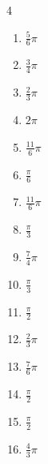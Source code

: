 \begin{multicols}{4}
\begin{enumerate}
  \item $\displaystyle \frac{5}{6}\pi$

  \item $\displaystyle \frac{3}{4}\pi$

  \item $\displaystyle \frac{2}{3}\pi$

  \item $\displaystyle 2\pi$

  \item $\displaystyle \frac{11}{6}\pi$

  \item $\displaystyle \frac{\pi}{6}$

  \item $\displaystyle \frac{11}{6}\pi$

  \item $\displaystyle \frac{\pi}{3}$

  \item $\displaystyle \frac{7}{4}\pi$

  \item $\displaystyle \frac{\pi}{3}$

  \item $\displaystyle \frac{\pi}{2}$

  \item $\displaystyle \frac{2}{3}\pi$

  \item $\displaystyle \frac{7}{6}\pi$

  \item $\displaystyle \frac{\pi}{2}$

  \item $\displaystyle \frac{\pi}{2}$

  \item $\displaystyle \frac{4}{3}\pi$


\end{enumerate}
\end{multicols}
